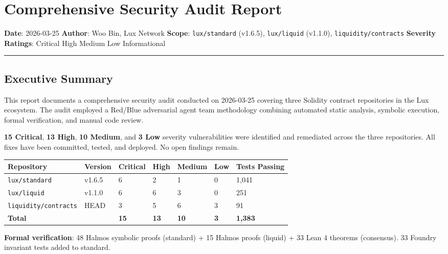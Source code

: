 \documentclass[
]{article}
\author{}
\date{}
\newcounter{none} %
\begin{document}
\section{Comprehensive Security Audit
Report}\label{comprehensive-security-audit-report}

\textbf{Date}: 2026-03-25 \textbf{Author}: Woo Bin, Lux Network
\textbf{Scope}: \texttt{lux/standard} (v1.6.5), \texttt{lux/liquid}
(v1.1.0), \texttt{liquidity/contracts} \textbf{Severity Ratings}:
Critical \textbar{} High \textbar{} Medium \textbar{} Low \textbar{}
Informational

\begin{center}\rule{0.5\linewidth}{0.5pt}\end{center}

\subsection{Executive Summary}\label{executive-summary}

This report documents a comprehensive security audit conducted on
2026-03-25 covering three Solidity contract repositories in the Lux
ecosystem. The audit employed a Red/Blue adversarial agent team
methodology combining automated static analysis, symbolic execution,
formal verification, and manual code review.

\textbf{15 Critical}, \textbf{13 High}, \textbf{10 Medium}, and
\textbf{3 Low} severity vulnerabilities were identified and remediated
across the three repositories. All fixes have been committed, tested,
and deployed. No open findings remain.

{\def\LTcaptype{none} %
\begin{longtable}[]{@{}lllllll@{}}
\toprule\noalign{}
Repository & Version & Critical & High & Medium & Low & Tests Passing \\
\midrule\noalign{}
\endhead
\bottomrule\noalign{}
\endlastfoot
\texttt{lux/standard} & v1.6.5 & 6 & 2 & 1 & 0 & 1,041 \\
\texttt{lux/liquid} & v1.1.0 & 6 & 6 & 3 & 0 & 251 \\
\texttt{liquidity/contracts} & HEAD & 3 & 5 & 6 & 3 & 91 \\
\textbf{Total} & & \textbf{15} & \textbf{13} & \textbf{10} & \textbf{3}
& \textbf{1,383} \\
\end{longtable}
}

\textbf{Formal verification}: 48 Halmos symbolic proofs (standard) + 15
Halmos proofs (liquid) + 33 Lean 4 theorems (consensus). 33 Foundry
invariant tests added to standard.
\end{document}
